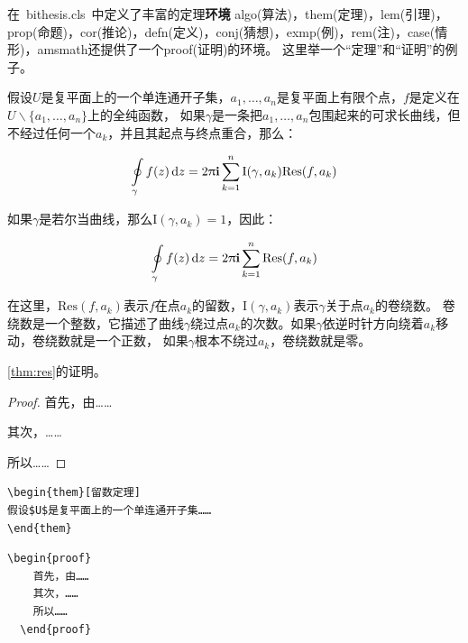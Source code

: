 在~bithesis.cls~中定义了丰富的定理\textbf{环境}
algo(算法)，them(定理)，lem(引理)，prop(命题)，cor(推论)，defn(定义)，conj(猜想)，exmp(例)，rem(注)，case(情形)，amsmath还提供了一个proof(证明)的环境。
这里举一个``定理''和``证明''的例子。
\begin{them}[留数定理]
\label{thm:res}
  假设$U$是复平面上的一个单连通开子集，$a_1,\ldots,a_n$是复平面上有限个点，$f$是定义在$U\backslash \{a_1,\ldots,a_n\}$上的全纯函数，
  如果$\gamma$是一条把$a_1,\ldots,a_n$包围起来的可求长曲线，但不经过任何一个$a_k$，并且其起点与终点重合，那么：

  \begin{equation}
    \label{eq:res}
    \ointop_{\gamma}f(z)\,\mathrm{d}z = 2\uppi\mathbf{i}\sum^n_{k=1}\mathrm{I}(\gamma,a_k)\mathrm{Res}(f,a_k)
  \end{equation}

  如果$\gamma$是若尔当曲线，那么$\mathrm{I}(\gamma, a_k)=1$，因此：

  \begin{equation}
    \label{eq:resthm}
    \ointop_{\gamma}f(z)\,\mathrm{d}z = 2\uppi\mathbf{i}\sum^n_{k=1}\mathrm{Res}(f,a_k)
  \end{equation}

  在这里，$\mathrm{Res}(f, a_k)$表示$f$在点$a_k$的留数，$\mathrm{I}(\gamma,a_k)$表示$\gamma$关于点$a_k$的卷绕数。
  卷绕数是一个整数，它描述了曲线$\gamma$绕过点$a_k$的次数。如果$\gamma$依逆时针方向绕着$a_k$移动，卷绕数就是一个正数，
  如果$\gamma$根本不绕过$a_k$，卷绕数就是零。

  \autoref{thm:res}的证明。
  
  \begin{proof}
    首先，由……

    其次，……

    所以……
  \end{proof}
  
\end{them}

\begin{lstlisting}[language={[LaTeX]TeX}, caption={定理环境}]
\begin{them}[留数定理]
假设$U$是复平面上的一个单连通开子集……
\end{them}
\end{lstlisting}

\begin{lstlisting}[language={[LaTeX]TeX}, caption={证明环境}]
  \begin{proof}
    首先，由……
    其次，……
    所以……
  \end{proof}
\end{lstlisting}

